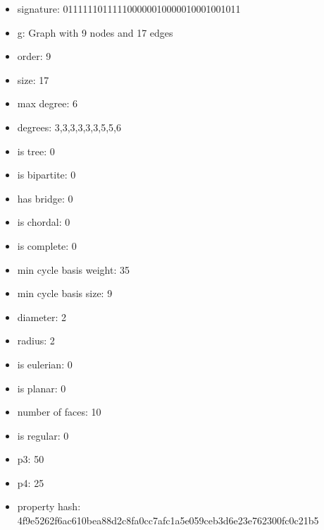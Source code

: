 \newpage
\begin{figure}
\end{figure}
\begin{itemize}
\item signature: 011111101111100000010000010001001011
\item g: Graph with 9 nodes and 17 edges
\item order: 9
\item size: 17
\item max degree: 6
\item degrees: 3,3,3,3,3,3,5,5,6
\item is tree: 0
\item is bipartite: 0
\item has bridge: 0
\item is chordal: 0
\item is complete: 0
\item min cycle basis weight: 35
\item min cycle basis size: 9
\item diameter: 2
\item radius: 2
\item is eulerian: 0
\item is planar: 0
\item number of faces: 10
\item is regular: 0
\item p3: 50
\item p4: 25
\item property hash: 4f9e5262f6ac610bea88d2c8fa0cc7afc1a5e059ceb3d6e23e762300fc0c21b5
\end{itemize}
